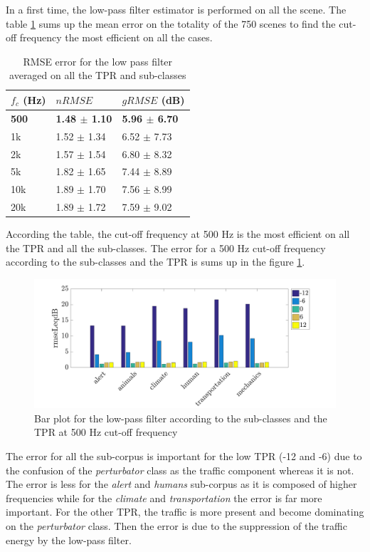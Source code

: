 \documentclass[twocolumn,a4paper,10pt]{article}
\begin{document}
In a first time, the low-pass filter estimator is performed on all the scene. The table \ref{tab:results_filter} sums up the mean error on the totality of the 750 scenes to find the cut-off frequency the most efficient on all the cases. 

\begin{table}[h]
\centering
\begin{tabular}{lll}
$f_c$ (Hz) & $nRMSE$ & $gRMSE$ (dB) \\ \hline
\textbf{500}  &\textbf{1.48 $\pm$ 1.10}&\textbf{5.96 $\pm$ 6.70}\\ \hline
1k &  1.52 $\pm$ 1.34 & 6.52 $\pm$ 7.73\\ \hline
2k & 1.57 $\pm$ 1.54 & 6.80 $\pm$ 8.32\\ \hline
5k & 1.82 $\pm$ 1.65 & 7.44 $\pm$ 8.89       \\ \hline
10k  & 1.89 $\pm$ 1.70 & 7.56 $\pm$ 8.99       \\ \hline
20k  & 1.89 $\pm$ 1.72 & 7.59 $\pm$ 9.02      
\end{tabular}
\caption{RMSE error for the low pass filter averaged on all the TPR and sub-classes}
\label{tab:results_filter}
\end{table}

According the table, the cut-off frequency at 500 Hz is the most efficient on all the TPR and all the sub-classes. The error for a 500 Hz cut-off frequency according to the sub-classes and the TPR is sums up in the figure \ref{fig:filterAmbiance}.

\begin{figure}[hbtp]
\centering
\includegraphics[width=\linewidth]{../image/filterAmbianceBar.pdf}
\caption{Bar plot for the low-pass filter according to the sub-classes and the TPR at 500 Hz cut-off frequency}
\label{fig:filterAmbiance}
\end{figure}

The error for all the sub-corpus is important for the low TPR (-12 and -6) due to the confusion of the \textit{perturbator} class as the traffic component whereas  it is not. The error is less for the \textit{alert} and \textit{humans} sub-corpus as it is composed of higher frequencies while for the \textit{climate} and \textit{transportation} the error is far more important. For the other TPR, the traffic is more present and become dominating on the \textit{perturbator} class. Then the error is due to the suppression of the traffic energy by the low-pass filter. 
\end{document}
